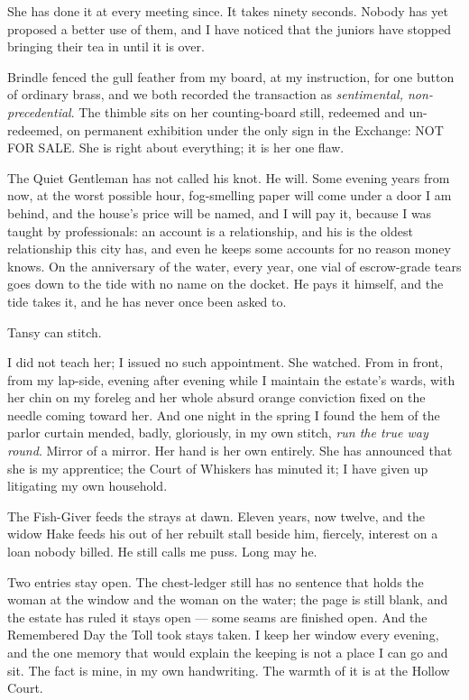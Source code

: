 She has done it at every meeting since. It takes ninety seconds. Nobody has yet proposed a better use of them, and I have noticed that the juniors have stopped bringing their tea in until it is over.

Brindle fenced the gull feather from my board, at my instruction, for one button of ordinary brass, and we both recorded the transaction as \emph{sentimental, non-precedential}. The thimble sits on her counting-board still, redeemed and un-redeemed, on permanent exhibition under the only sign in the Exchange: NOT FOR SALE. She is right about everything; it is her one flaw.

The Quiet Gentleman has not called his knot. He will. Some evening years from now, at the worst possible hour, fog-smelling paper will come under a door I am behind, and the house's price will be named, and I will pay it, because I was taught by professionals: an account is a relationship, and his is the oldest relationship this city has, and even he keeps some accounts for no reason money knows. On the anniversary of the water, every year, one vial of escrow-grade tears goes down to the tide with no name on the docket. He pays it himself, and the tide takes it, and he has never once been asked to.

Tansy can stitch.

I did not teach her; I issued no such appointment. She watched. From in front, from my lap-side, evening after evening while I maintain the estate's wards, with her chin on my foreleg and her whole absurd orange conviction fixed on the needle coming toward her. And one night in the spring I found the hem of the parlor curtain mended, badly, gloriously, in my own stitch, \emph{run the true way round}. Mirror of a mirror. Her hand is her own entirely. She has announced that she is my apprentice; the Court of Whiskers has minuted it; I have given up litigating my own household.

The Fish-Giver feeds the strays at dawn. Eleven years, now twelve, and the widow Hake feeds his out of her rebuilt stall beside him, fiercely, interest on a loan nobody billed. He still calls me puss. Long may he.

Two entries stay open. The chest-ledger still has no sentence that holds the woman at the window and the woman on the water; the page is still blank, and the estate has ruled it stays open --- some seams are finished open. And the Remembered Day the Toll took stays taken. I keep her window every evening, and the one memory that would explain the keeping is not a place I can go and sit. The fact is mine, in my own handwriting. The warmth of it is at the Hollow Court.

